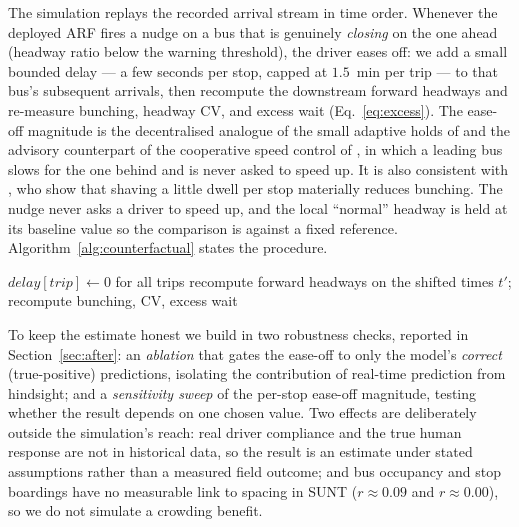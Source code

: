 \documentclass[11pt,a4paper]{article}
\begin{document}
The simulation replays the recorded arrival stream in time order. Whenever the deployed ARF fires a
nudge on a bus that is genuinely \emph{closing} on the one ahead (headway ratio below the warning
threshold), the driver eases off: we add a small bounded delay --- a few seconds per stop, capped at
$1.5$~min per trip --- to that bus's subsequent arrivals, then recompute the downstream forward
headways and re-measure bunching, headway $\mathrm{CV}$, and excess wait (Eq.~\ref{eq:excess}). The
ease-off magnitude is the decentralised analogue of the small adaptive holds of \citet{Daganzo2009}
and the advisory counterpart of the cooperative speed control of \citet{DaganzoPilachowski2011}, in
which a leading bus slows for the one behind and is never asked to speed up. It is also consistent
with \citet{Enayatollahi2019}, who show that shaving a little dwell per stop materially reduces
bunching. The nudge never asks a driver to speed up, and the local ``normal'' headway is held at its
baseline value so the comparison is against a fixed reference.
Algorithm~\ref{alg:counterfactual} states the procedure.

\begin{algorithm}[H]
\footnotesize
\DontPrintSemicolon
{}
\BlankLine
$\textit{delay}[\textit{trip}] \leftarrow 0$ for all trips\;
recompute forward headways on the shifted times $t'$; recompute bunching, CV, excess wait\;
\caption{Counterfactual ease-off replay (simulation).}
\label{alg:counterfactual}
\end{algorithm}

To keep the estimate honest we build in two robustness checks, reported in Section~\ref{sec:after}:
an \emph{ablation} that gates the ease-off to only the model's \emph{correct} (true-positive)
predictions, isolating the contribution of real-time prediction from hindsight; and a
\emph{sensitivity sweep} of the per-stop ease-off magnitude, testing whether the result depends on
one chosen value. Two effects are deliberately outside the simulation's reach: real driver compliance
and the true human response are not in historical data, so the result is an estimate under stated
assumptions rather than a measured field outcome; and bus occupancy and stop boardings have no
measurable link to spacing in SUNT ($r\approx0.09$ and $r\approx0.00$), so we do not simulate a
crowding benefit.
\end{document}
